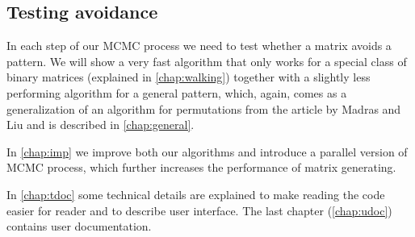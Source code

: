 \subsection*{Testing avoidance}
In each step of our MCMC process we need to test whether a matrix avoids a pattern. We will show a very fast algorithm that only works for a special class of binary matrices (explained in \autoref{chap:walking}) together with a slightly less performing algorithm for a general pattern, which, again, comes as a generalization of an algorithm for permutations from the article by Madras and Liu and is described in \autoref{chap:general}.

In \autoref{chap:imp} we improve both our algorithms and introduce a parallel version of MCMC process, which further increases the performance of matrix generating.

In \autoref{chap:tdoc} some technical details are explained to make reading the code easier for reader and to describe user interface. The last chapter (\autoref{chap:udoc}) contains user documentation.

